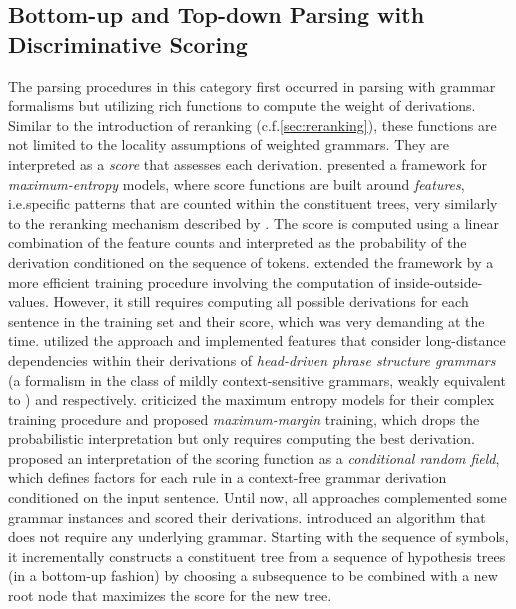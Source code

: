 \documentclass[../document.tex]{subfiles}
\begin{document}
    \subsection{Bottom-up and Top-down Parsing with Discriminative Scoring}\label{sec:literature:chart}
    The parsing procedures in this category first occurred in parsing with grammar formalisms but utilizing rich functions to compute the weight of derivations.
    Similar to the introduction of reranking (c.f.\@ \cref{sec:reranking}), these functions are not limited to the locality assumptions of weighted grammars. They are interpreted as a \emph{score} that assesses each derivation.
    \citet{Johnson99} presented a framework for \emph{maximum-entropy} models, where score functions are built around \emph{features}, i.e.\@ specific patterns that are counted within the constituent trees, very similarly to the reranking mechanism described by \citet{collins2001convolution}.
    The score is computed using a linear combination of the feature counts and interpreted as the probability of the derivation conditioned on the sequence of tokens.
    \citet{Miyao02} extended the framework by a more efficient training procedure involving the computation of inside-outside-values.
    However, it still requires computing all possible derivations for each sentence in the training set and their score, which was very demanding at the time.
    \citet{Toutanova02,Clark04a} utilized the approach and implemented features that consider long-distance dependencies within their derivations of \emph{head-driven phrase structure grammars} (a formalism in the class of mildly context-sensitive grammars, weakly equivalent to ) and  respectively.
    \citet{Taskar04} criticized the maximum entropy models for their complex training procedure and proposed \emph{maximum-margin} training, which drops the probabilistic interpretation but only requires computing the best derivation.
    \citet{Finkel08} proposed an interpretation of the scoring function as a \emph{conditional random field}, which defines factors for each rule in a context-free grammar derivation conditioned on the input sentence.
    Until now, all approaches complemented some grammar instances and scored their derivations.
    \citet{Turian06} introduced an algorithm that does not require any underlying grammar.
    Starting with the sequence of  symbols, it incrementally constructs a constituent tree from a sequence of hypothesis trees (in a bottom-up fashion) by choosing a subsequence to be combined with a new root node that maximizes the score for the new tree.
\end{document}
